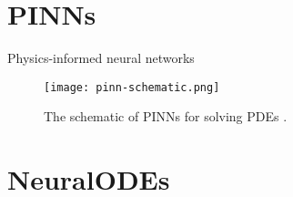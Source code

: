 \section{PINNs}

\begin{frame}{Physics-informed neural networks}
    \begin{figure}[h]
        \centering
        \texttt{[image: pinn-schematic.png]}
        \caption{The schematic of \glspl{PINN} for solving \glspl{PDE} \cite{guoSolvingPartialDifferential2020}.}
        \label{fig:pinn-schematic}
    \end{figure}
\end{frame}

\section{NeuralODEs}

